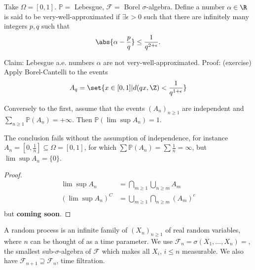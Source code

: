 \documentclass{article}
\newcommand{\1}[1]{\mathbbm{1}_{#1}}
\newcommand{\Prob}{\mathbb{P}}
\begin{document}
\begin{eg}
    Take $\Omega = [0, 1]$. $\Prob=$ Lebesgue, $\mathcal{F}=$ Borel $\sigma$-algebra.
    Define a number $\alpha \in \R$ is said to be very-well-approximated if $\exists \epsilon > 0$ such that there are infinitely many integers $p,q$ such that
    \begin{equation*}
        \abs{\alpha - \frac{p}{q}} \leq \frac{1}{q^{2 + \epsilon}}.
    \end{equation*}

    Claim: Lebesgue a.e. numbers $\alpha$ are not very-well-approximated.
    Proof: (exercise) Apply Borel-Cantelli to the events
    \begin{equation}
        A_q = \set{x \in [0, 1] | d(q x, \Z) < \frac{1}{q^{1 + \epsilon}}}
    \end{equation}
\end{eg}

\begin{lemma}
    Conversely to the first, assume that the events $(A_n)_{n \geq 1}$ are independent and $\sum_{n \geq 1} \Prob(A_n) = + \infty$.
    Then $\Prob(\lim \sup A_n) = 1$.
\end{lemma}

\begin{remark}
    The conclusion fails without the assumption of independence, for instance $A_n = [0, \frac{1}{n}] \subseteq \Omega = [0, 1]$, for which $\sum \Prob(A_n) = \sum \frac{1}{n} = \infty$, but $\lim \sup A_n = \{0\}$.
\end{remark}

\begin{proof}
    \begin{align*}
        \lim \sup A_n &= \bigcap_{m \geq 1} \bigcup_{n \geq m} A_m \\
        (\lim \sup A_n)^C &= \bigcup_{m \geq 1} \bigcap_{n \geq m} (A_m)^c \\
    \end{align*}
    but \textbf{coming soon}.
\end{proof}

\begin{defi}
    A random process is an infinite family of $(X_n)_{n \geq 1}$ of real random variables, where $n$ can be thought of as a time parameter.
    We use $\mathcal{F}_n = \sigma(X_1, \dotsc, X_n) =$, the smallest sub-$\sigma$-algebra of $\mathcal{F}$ which makes all $X_i$, $i \leq n$ measurable.
    We also have $\mathcal{F}_{n+1} \supseteq \mathcal{F}_n$, time filtration.
\end{defi}
\end{document}
